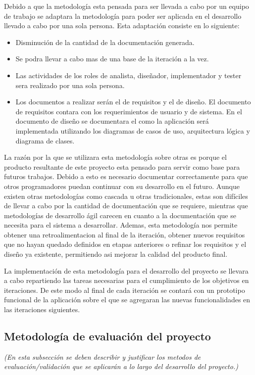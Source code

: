 \documentclass[11pt,letterpaper]{article}
\begin{document}
Debido a que la metodología esta pensada para ser llevada a cabo por un equipo de trabajo se adaptara la metodología para poder ser aplicada en el desarrollo llevado a cabo por una sola persona. Esta adaptación consiste en lo siguiente:
\begin{itemize}
	\item Disminución de la cantidad de la documentación generada.
	\item Se podra llevar a cabo mas de una base de la iteración a la vez.
	\item Las actividades de los roles de analista, diseñador, implementador y tester sera realizado por una sola persona.
	\item  Los documentos a realizar serán el de requisitos y el de diseño. El documento de requisitos contara con los requerimientos de usuario y de sistema. En el documento de diseño se documentara el como la aplicación será implementada utilizando los diagramas de casos de uso, arquitectura lógica y diagrama de clases.
\end{itemize}
La razón por la que se utilizara esta metodología sobre otras es porque el producto resultante de este proyecto esta pensado para servir como base para futuros trabajos. Debido a esto es necesario documentar correctamente para que otros programadores puedan continuar con su desarrollo en el futuro. Aunque existen otras metodologías como cascada u otras tradicionales, estas son difíciles de llevar a cabo por la cantidad de documentación que se requiere, mientras que metodologías de desarrollo ágil carecen en cuanto a la documentación que se necesita para el sistema a desarrollar. Ademas, esta metodología nos permite obtener una retroalimentacion al final de la iteración, obtener nuevos requisitos que no hayan quedado definidos en etapas anteriores o refinar los requisitos y el diseño ya existente, permitiendo asi mejorar la calidad del producto final.

La implementación de esta metodología para el desarrollo del proyecto se llevara a cabo repartiendo las tareas necesarias para el cumplimiento de los objetivos en iteraciones. De este modo al final de cada iteración se contará con un prototipo funcional de la aplicación sobre el que se agregaran las nuevas funcionalidades en las iteraciones siguientes.

\subsection{Metodología de evaluación del proyecto}
\emph{(En esta subsección se deben describir y justificar los metodos de evaluación/validación que se aplicarán a lo largo del desarrollo del proyecto.)}
\end{document}
